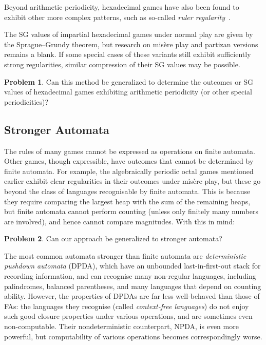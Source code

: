 \documentclass[11pt]{article}
\theoremstyle{definition}
\newtheorem{problem}{Problem}[section]
\theoremstyle{plain}
\begin{document}
Beyond arithmetic periodicity, hexadecimal games have also been found to exhibit other more complex patterns, such as so-called \textit{ruler regularity}~\cite{2020Hexa}.

The SG values of impartial hexadecimal games under normal play are given by the Sprague--Grundy theorem, but research on misère play and partizan versions remains a blank.
If some special cases of these variants still exhibit sufficiently strong regularities, similar compression of their SG values may be possible.

\begin{problem}
    Can this method be generalized to determine the outcomes or SG values of hexadecimal games exhibiting arithmetic periodicity (or other special periodicities)?
\end{problem}

\subsection{Stronger Automata}

The rules of many games cannot be expressed as operations on finite automata.
Other games, though expressible, have outcomes that cannot be determined by finite automata.
For example, the algebraically periodic octal games mentioned earlier exhibit clear regularities in their outcomes under misère play, but these go beyond the class of languages recognisable by finite automata.
This is because they require comparing the largest heap with the sum of the remaining heaps, but finite automata cannot perform counting (unless only finitely many numbers are involved), and hence cannot compare magnitudes.
With this in mind:

\begin{problem}
    Can our approach be generalized to stronger automata?
\end{problem}

The most common automata stronger than finite automata are \textit{deterministic pushdown automata} (DPDA), which have an unbounded last-in-first-out stack for recording information, and can recognise many non-regular languages, including palindromes, balanced parentheses, and many languages that depend on counting ability.
However, the properties of DPDAs are far less well-behaved than those of FAs: the languages they recognise (called \textit{context-free languages}) do not enjoy such good closure properties under various operations, and are sometimes even non-computable.
Their nondeterministic counterpart, NPDA, is even more powerful, but computability of various operations becomes correspondingly worse.
\end{document}
